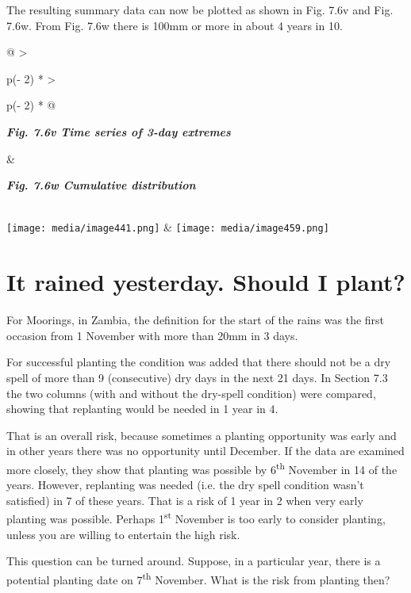 \documentclass[
  letterpaper,
  DIV=11,
  numbers=noendperiod]{scrreprt}
\begin{document}
The resulting summary data can now be plotted as shown in Fig. 7.6v and
Fig. 7.6w. From Fig. 7.6w there is 100mm or more in about 4 years in 10.

\begin{longtable}[]{@{}
  >{\raggedright\arraybackslash}p{(\columnwidth - 2\tabcolsep) * }
  >{\raggedright\arraybackslash}p{(\columnwidth - 2\tabcolsep) * }@{}}
\toprule\noalign{}
\begin{minipage}[b]{\linewidth}\raggedright
\textbf{\emph{Fig. 7.6v Time series of 3-day extremes}}
\end{minipage} & \begin{minipage}[b]{\linewidth}\raggedright
\textbf{\emph{Fig. 7.6w Cumulative distribution}}
\end{minipage} \\
\midrule\noalign{}
\endhead
\bottomrule\noalign{}
\endlastfoot
\texttt{[image: media/image441.png]} &
\texttt{[image: media/image459.png]} \\
\end{longtable}

\section{It rained yesterday. Should I
plant?}\label{it-rained-yesterday.-should-i-plant}

For Moorings, in Zambia, the definition for the start of the rains was
the first occasion from 1 November with more than 20mm in 3 days.

For successful planting the condition was added that there should not be
a dry spell of more than 9 (consecutive) dry days in the next 21 days.
In Section 7.3 the two columns (with and without the dry-spell
condition) were compared, showing that replanting would be needed in 1
year in 4.

That is an overall risk, because sometimes a planting opportunity was
early and in other years there was no opportunity until December. If the
data are examined more closely, they show that planting was possible by
6\textsuperscript{th} November in 14 of the years. However, replanting
was needed (i.e. the dry spell condition wasn't satisfied) in 7 of these
years. That is a risk of 1 year in 2 when very early planting was
possible. Perhaps 1\textsuperscript{st} November is too early to
consider planting, unless you are willing to entertain the high risk.

This question can be turned around. Suppose, in a particular year, there
is a potential planting date on 7\textsuperscript{th} November. What is
the risk from planting then?
\end{document}
